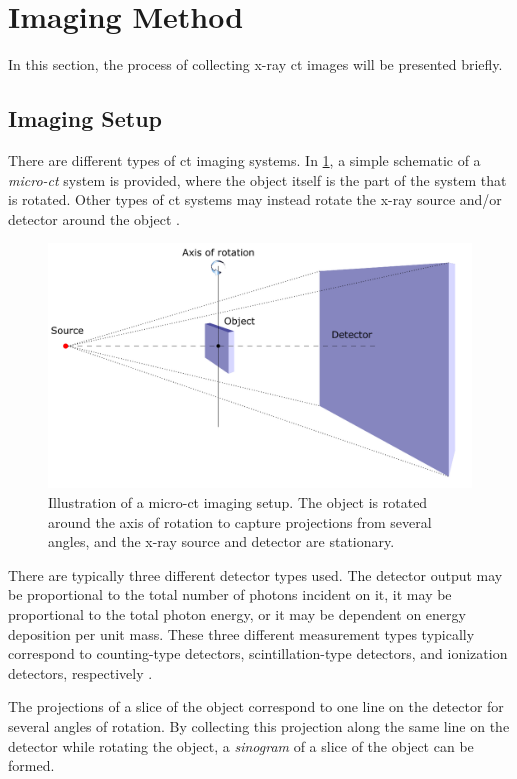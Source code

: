 \clearpage
\section{Imaging Method}
\label{sec:ct:imagingmethod}
In this section, the process of collecting x-ray \gls{ct} images will be presented briefly.

\subsection{Imaging Setup}
\label{sec:ct:imagingmethod:setup}
There are different types of \gls{ct} imaging systems. In \cref{fig:ctsetup}, a simple schematic of a \textit{micro-\gls{ct}} system is provided, where the object itself is the part of the system that is rotated. Other types of \gls{ct} systems may instead rotate the x-ray source and/or detector around the object \cite[126-129]{KakSlaney98}. 
\begin{figure}[htbp]  
    \centering
    \includegraphics[width=.9\textwidth]{figures/ctsetup.pdf}
    \caption[Illustration of a CT imaging setup]{Illustration of a micro-\gls{ct} imaging setup. The object is rotated around the axis of rotation to capture projections from several angles, and the x-ray source and detector are stationary. }
    \label{fig:ctsetup}
\end{figure}

There are typically three different detector types used. The detector output may be proportional to the total number of photons incident on it, it may be proportional to the total photon energy, or it may be dependent on energy deposition per unit mass. These three different measurement types typically correspond to counting-type detectors, scintillation-type detectors, and ionization detectors, respectively \cite[118]{KakSlaney98}. 

The projections of a slice of the object correspond to one line on the detector for several angles of rotation. By collecting this projection along the same line on the detector while rotating the object, a \textit{sinogram} of a slice of the object can be formed. 

